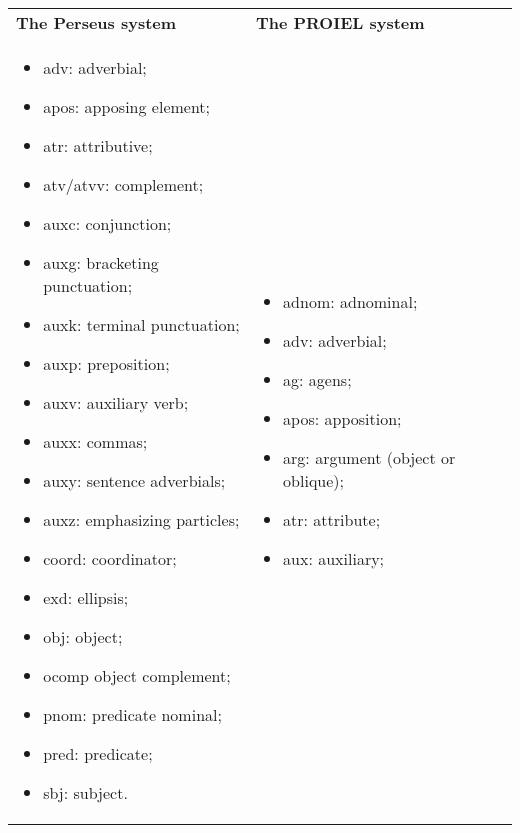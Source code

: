 \begin{table}
  \begin{tabular}{|l|l|}
    \hline
    \textbf{The Perseus system} & \textbf{The PROIEL system} \\ \thickhline
    \begin{minipage}{2.5in}
      \begin{itemize}[noitemsep,topsep=0pt,parsep=0pt,partopsep=0pt]
      \item adv: adverbial;
      \item apos: apposing element;
      \item atr: attributive;
      \item atv/atvv: complement;
      \item auxc: conjunction;
      \item auxg: bracketing punctuation;
      \item auxk: terminal punctuation;
      \item auxp: preposition;
      \item auxv: auxiliary verb;
      \item auxx: commas;
      \item auxy: sentence adverbials;
      \item auxz: emphasizing particles;
      \item coord: coordinator;
      \item exd: ellipsis;
      \item obj: object;
      \item ocomp object complement;
      \item pnom: predicate nominal;
      \item pred: predicate;
      \item sbj: subject.
      \end{itemize}
    \end{minipage} &
    \begin{minipage}{2.5in}
      \begin{itemize}[noitemsep,topsep=0pt,parsep=0pt,partopsep=0pt]
      \item adnom: adnominal;
      \item adv: adverbial;
      \item ag: agens;
      \item apos: apposition;
      \item arg: argument (object or oblique);
      \item atr: attribute;
      \item aux: auxiliary;

\end{itemize}
\end{minipage}
\end{tabular}
\end{table}
